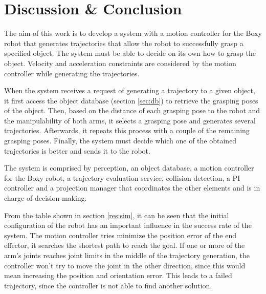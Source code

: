

\chapter{Discussion \& Conclusion}

The aim of this work is to develop a system with a motion controller for the Boxy robot that generates trajectories that allow the robot to successfully grasp a specified object. The system must be able to decide on its own how to grasp the object. Velocity and acceleration constraints are considered by the motion controller while generating the trajectories. 

When the system receives a request of generating a trajectory to a given object, it first access the object database (section \ref{sec:db}) to retrieve the grasping poses of the object. Then, based on the distance of each grasping pose to the robot and the manipulability of both arms, it selects a grasping pose and generates several trajectories. Afterwards, it repeats this process with a couple of the remaining grasping poses. Finally, the system must decide which one of the obtained trajectories is better and sends it to the robot.

The system is comprised by perception, an object database, a motion controller for the Boxy robot, a trajectory evaluation service, collision detection, a PI controller and a projection manager that coordinates the other elements and is in charge of decision making.

From the table shown in section \ref{res:sim}, it can be seen that the initial configuration of the robot has an important influence in the success rate of the system. The motion controller tries minimize the position error of the end effector, it searches the shortest path to reach the goal. If one or more of the arm's joints reaches joint limits in the middle of the trajectory generation, the controller won't try to move the joint in the other direction, since this would mean increasing the position and orientation error. This leads to a failed trajectory, since the controller is not able to find another solution.

